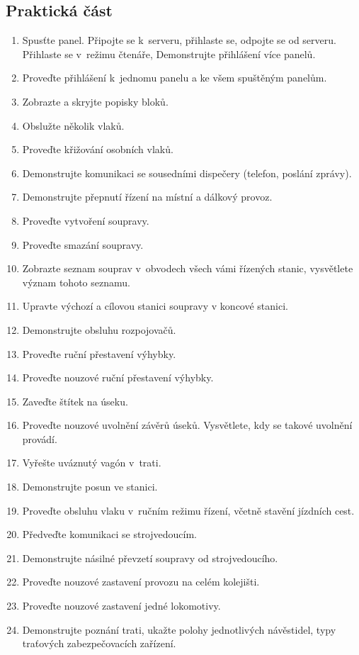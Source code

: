 \documentclass[12pt,a4paper]{article}
\begin{document}
\subsection*{Praktická část}

\begin{enumerate}[leftmargin=*]
\item Spusťte panel. Připojte se k~serveru, přihlaste se, odpojte se od
serveru. Přihlaste se v~režimu čtenáře, Demonstrujte přihlášení více panelů.
\item Proveďte přihlášení k~jednomu panelu a ke všem spuštěným panelům.
\item Zobrazte a skryjte popisky bloků.

\item Obslužte několik vlaků.
\item Proveďte křižování osobních vlaků.

\item Demonstrujte komunikaci se sousedními dispečery (telefon, poslání zprávy).
\item Demonstrujte přepnutí řízení na místní a dálkový provoz.

\item Proveďte vytvoření soupravy.
\item Proveďte smazání soupravy.
\item Zobrazte seznam souprav v~obvodech všech vámi řízených stanic, vysvětlete
význam tohoto seznamu.
\item Upravte výchozí a cílovou stanici soupravy v koncové stanici.

\item Demonstrujte obsluhu rozpojovačů.
\item Proveďte ruční přestavení výhybky.
\item Proveďte nouzové ruční přestavení výhybky.
\item Zaveďte štítek na úseku.
\item Proveďte nouzové uvolnění závěrů úseků. Vysvětlete, kdy se takové uvolnění
provádí.
\item Vyřešte uváznutý vagón v~trati.

\item Demonstrujte posun ve stanici.
\item Proveďte obsluhu vlaku v~ručním režimu řízení, včetně stavění jízdních
cest.

\item Předveďte komunikaci se strojvedoucím.
\item Demonstrujte násilné převzetí soupravy od strojvedoucího.

\item Proveďte nouzové zastavení provozu na celém kolejišti.
\item Proveďte nouzové zastavení jedné lokomotivy.

\item Demonstrujte poznání trati, ukažte polohy jednotlivých návěstidel, typy
traťových zabezpečovacích zařízení.
\end{enumerate}
\end{document}
